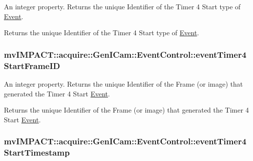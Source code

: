 An integer property. Returns the unique Identifier of the Timer 4 Start type of \hyperlink{classmv_i_m_p_a_c_t_1_1acquire_1_1_event}{Event}. 

Returns the unique Identifier of the Timer 4 Start type of \hyperlink{classmv_i_m_p_a_c_t_1_1acquire_1_1_event}{Event}. \hypertarget{classmv_i_m_p_a_c_t_1_1acquire_1_1_gen_i_cam_1_1_event_control_aa9c6d56c1ad9fbab414034a81a0d0ad5}{
\subsubsection[{event\+Timer4\+Start\+Frame\+I\+D}]{ mv\+I\+M\+P\+A\+C\+T\+::acquire\+::\+Gen\+I\+Cam\+::\+Event\+Control\+::event\+Timer4\+Start\+Frame\+I\+D}}\label{classmv_i_m_p_a_c_t_1_1acquire_1_1_gen_i_cam_1_1_event_control_aa9c6d56c1ad9fbab414034a81a0d0ad5}


An integer property. Returns the unique Identifier of the Frame (or image) that generated the Timer 4 Start \hyperlink{classmv_i_m_p_a_c_t_1_1acquire_1_1_event}{Event}. 

Returns the unique Identifier of the Frame (or image) that generated the Timer 4 Start \hyperlink{classmv_i_m_p_a_c_t_1_1acquire_1_1_event}{Event}. \hypertarget{classmv_i_m_p_a_c_t_1_1acquire_1_1_gen_i_cam_1_1_event_control_a4e09e54ffd2a45b69c95c6ae23944fdb}{
\subsubsection[{event\+Timer4\+Start\+Timestamp}]{ mv\+I\+M\+P\+A\+C\+T\+::acquire\+::\+Gen\+I\+Cam\+::\+Event\+Control\+::event\+Timer4\+Start\+Timestamp}}\label{classmv_i_m_p_a_c_t_1_1acquire_1_1_gen_i_cam_1_1_event_control_a4e09e54ffd2a45b69c95c6ae23944fdb}


